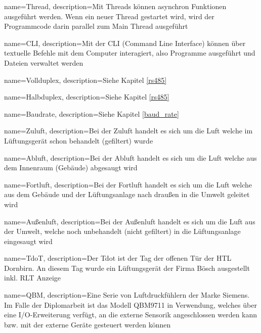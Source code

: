 {
	name=Thread,
	description={Mit Threads können asynchron Funktionen ausgeführt werden. Wenn ein neuer Thread gestartet wird, wird der Programmcode darin parallel zum Main Thread ausgeführt}
}

{
	name=CLI,
	description={Mit der CLI (Command Line Interface) können über textuelle Befehle mit dem Computer interagiert, also Programme ausgeführt und Dateien verwaltet werden \cite{loshin_gillis:2022}}
}

{
	name=Vollduplex,
	description={Siehe Kapitel \ref{rs485} }
}

{
	name=Halbduplex,
	description={Siehe Kapitel \ref{rs485} }
}

{
	name=Baudrate,
	description={Siehe Kapitel \ref{baud_rate} }
}


{
	name=Zuluft,
	description={Bei der Zuluft handelt es sich um die Luft welche im Lüftungsgerät schon behandelt (gefiltert) wurde}
}

{
	name=Abluft,
	description={Bei der Abluft handelt es sich um die Luft welche aus dem Innenraum (Gebäude) abgesaugt wird}
}

{
	name=Fortluft,
	description={Bei der Fortluft handelt es sich um die Luft welche aus dem Gebäude und der Lüftungsanlage nach draußen in die Umwelt geleitet wird}
}

{
	name=Außenluft,
	description={Bei der Außenluft handelt es sich um die Luft aus der Umwelt, welche noch unbehandelt (nicht gefiltert) in die Lüftungsanlage eingesaugt wird}
}

{
	name=TdoT,
	description={Der Tdot ist der Tag der offenen Tür der HTL Dornbirn. An diesem Tag wurde ein Lüftungsgerät der Firma Bösch ausgestellt inkl. RLT Anzeige}
}

{
	name=QBM,
	description={Eine Serie von Luftdruckfühlern der Marke Siemens. Im Falle der Diplomarbeit ist das Modell QBM9711 in Verwendung, welches über eine I/O-Erweiterung verfügt, an die externe Sensorik angeschlossen werden kann bzw. mit der externe Geräte gesteuert werden können}
}

